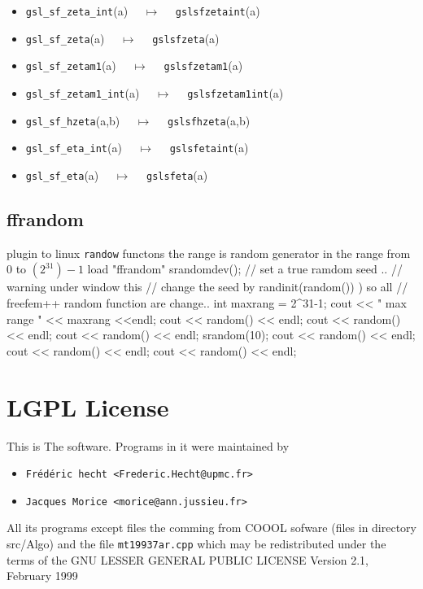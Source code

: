\documentclass[a4paper,twoside,12pt]{book}
\begin{document}
{\begin{itemize}
\item \texttt{gsl\_sf\_zeta\_int}(a) $\quad \mapsto\quad $ \texttt{gslsfzetaint}(a) 
\item \texttt{gsl\_sf\_zeta}(a) $\quad \mapsto\quad $ \texttt{gslsfzeta}(a) 
\item \texttt{gsl\_sf\_zetam1}(a) $\quad \mapsto\quad $ \texttt{gslsfzetam1}(a) 
\item \texttt{gsl\_sf\_zetam1\_int}(a) $\quad \mapsto\quad $ \texttt{gslsfzetam1int}(a) 
\item \texttt{gsl\_sf\_hzeta}(a,b) $\quad \mapsto\quad $ \texttt{gslsfhzeta}(a,b) 
\item \texttt{gsl\_sf\_eta\_int}(a) $\quad \mapsto\quad $ \texttt{gslsfetaint}(a) 
\item \texttt{gsl\_sf\_eta}(a) $\quad \mapsto\quad $ \texttt{gslsfeta}(a) 
\end{itemize}

}
\subsection{ffrandom}
\label{section:ffrandom}

plugin to linux \texttt{randow} functons  the range is  random generator
in the range from $0$ to $(2^{31})-1$ 
\bFF
load "ffrandom"
srandomdev();  // set a true ramdom seed ..
//  warning under window this
// change the seed by  randinit(random()) ) so all
// freefem++ random function are change..
int maxrang = 2^31-1; 
cout << " max range " << maxrang <<endl;
cout << random() << endl;
cout << random() << endl;
cout << random() << endl;
srandom(10);
cout << random() << endl;
cout << random() << endl;
cout << random() << endl;

\eFF
\section*{\freefempp LGPL License}
This is The \freefempp software.
Programs in it were maintained by
\begin{itemize}
\item \texttt{Fr\'{e}d\'{e}ric hecht <Frederic.Hecht@upmc.fr>}
\item \texttt{Jacques Morice <morice@ann.jussieu.fr>}
\end{itemize}

All its programs except files the comming from
  COOOL sofware (files in directory src/Algo)
 and the file \texttt{mt19937ar.cpp}
which may be redistributed under the terms of the
 GNU LESSER GENERAL PUBLIC LICENSE Version 2.1, February 1999
\end{document}
